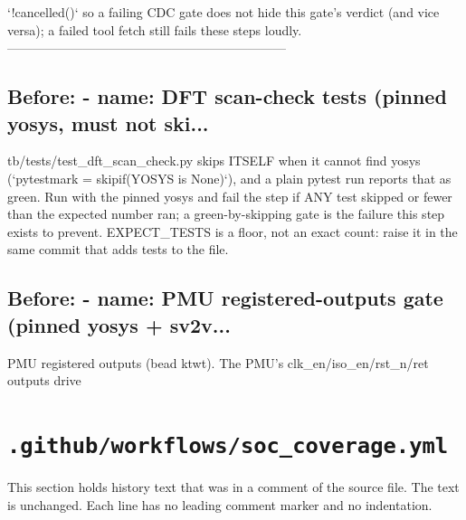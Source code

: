 \begin{record}
\begin{textblock}
`!cancelled()` so a failing CDC gate does not hide this gate's verdict (and
vice versa); a failed tool fetch still fails these steps loudly.
------------------------------------------------------------------
\end{textblock}

\subsection*{Before: - name: DFT scan-check tests (pinned yosys, must not ski...}

\begin{textblock}
tb/tests/test_dft_scan_check.py skips ITSELF when it cannot find yosys
(`pytestmark = skipif(YOSYS is None)`), and a plain pytest run reports that as
green. Run with the pinned yosys and fail the step if ANY test skipped or fewer
than the expected number ran; a green-by-skipping gate is the failure this
step exists to prevent. EXPECT_TESTS is a floor, not an exact count: raise it
in the same commit that adds tests to the file.
\end{textblock}

\subsection*{Before: - name: PMU registered-outputs gate (pinned yosys + sv2v...}

\begin{textblock}
PMU registered outputs (bead ktwt). The PMU's clk_en/iso_en/rst_n/ret outputs drive
\end{textblock}

\end{record}

\section{\texttt{.github/workflows/soc\_coverage.yml}}\label{cr:flow:ci-soc-coverage}

This section holds history text that was in a comment of the source file. The text is unchanged. Each line has no leading comment marker and no indentation.

